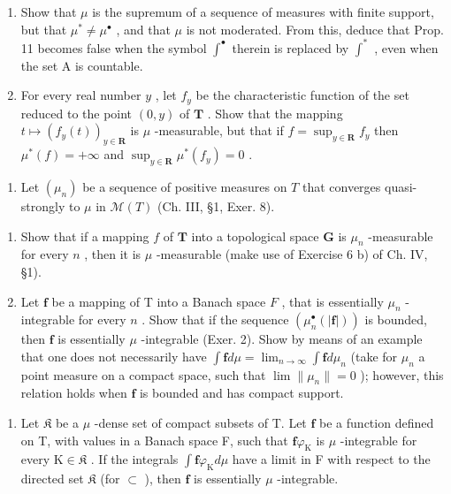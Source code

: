 \begin{enumerate}
\def\labelenumi{\alph{enumi})}
\item
  Show that \(\mu\) is the supremum of a sequence of measures with finite support, but that \(\mu^{*} \neq \mu^{\bullet}\) , and that \(\mu\) is not moderated. From this, deduce that Prop. 11 becomes false when the symbol \(\int^{\bullet}\) therein is replaced by \(\int^{*}\) , even when the set A is countable.
\item
  For every real number \(y\) , let \(f_y\) be the characteristic function of the set reduced to the point \((0, y)\) of \(\mathbf{T}\) . Show that the mapping \(t \mapsto (f_y(t))_{y \in \mathbf{R}}\) is \(\mu\) -measurable, but that if \(f = \sup_{y \in \mathbf{R}} f_y\) then \(\mu^*(f) = +\infty\) and \(\sup_{y \in \mathbf{R}} \mu^*(f_y) = 0\) .
\end{enumerate}

\begin{enumerate}
\def\labelenumi{\arabic{enumi})}
\setcounter{enumi}{4}
\tightlist
\item
  Let \((\mu_n)\) be a sequence of positive measures on \(T\) that converges quasi-strongly to \(\mu\) in \(\mathcal{M}(T)\) (Ch. III, §1, Exer. 8).
\end{enumerate}

\begin{enumerate}
\def\labelenumi{\alph{enumi})}
\item
  Show that if a mapping \(f\) of \(\mathbf{T}\) into a topological space \(\mathbf{G}\) is \(\mu_n\) -measurable for every \(n\) , then it is \(\mu\) -measurable (make use of Exercise 6 b) of Ch. IV, §1).
\item
  Let \(\mathbf{f}\) be a mapping of T into a Banach space \(F\) , that is essentially \(\mu_n\) -integrable for every \(n\) . Show that if the sequence \((\mu_n^\bullet (|\mathbf{f}|))\) is bounded, then \(\mathbf{f}\) is essentially \(\mu\) -integrable (Exer. 2). Show by means of an example that one does not necessarily have \(\int \mathbf{f} d\mu = \lim_{n\to \infty}\int \mathbf{f} d\mu_n\) (take for \(\mu_n\) a point measure on a compact space, such that \(\lim \| \mu_n\| = 0\) ); however, this relation holds when \(\mathbf{f}\) is bounded and has compact support.
\end{enumerate}

\begin{enumerate}
\def\labelenumi{\arabic{enumi})}
\setcounter{enumi}{5}
\tightlist
\item
  Let \(\mathfrak{K}\) be a \(\mu\) -dense set of compact subsets of T. Let \(\mathbf{f}\) be a function defined on T, with values in a Banach space F, such that \(\mathbf{f}\varphi_{\mathrm{K}}\) is \(\mu\) -integrable for every \(\mathrm{K} \in \mathfrak{K}\) . If the integrals \(\int \mathbf{f}\varphi_{\mathrm{K}} d\mu\) have a limit in F with respect to the directed set \(\mathfrak{K}\) (for \(\subset\) ), then \(\mathbf{f}\) is essentially \(\mu\) -integrable.
\end{enumerate}

